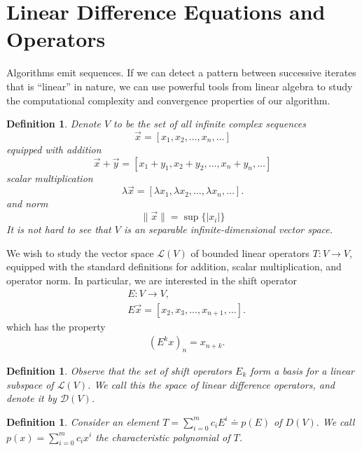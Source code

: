 \documentclass[12pt,reqno]{amsart}
\numberwithin{equation}{section}  %
\newtheorem{definition}[theorem]{Definition}
\begin{document}
\section{Linear Difference Equations and Operators}

Algorithms emit sequences. If we can detect a pattern between successive
iterates that is ``linear'' in nature, we can use powerful tools from linear
algebra to study the computational complexity and convergence properties of our
algorithm.
\begin{definition}
Denote $V$ to be the set of all infinite complex sequences
\begin{equation*}
\vec{x} = [x_1, x_2, \ldots, x_n, \ldots]
\end{equation*}
equipped with addition
\begin{equation*}
\vec{x} + \vec{y} = [x_1 + y_1, x_2 + y_2, \ldots, x_n + y_n, \ldots]	
\end{equation*}
scalar multiplication
\begin{equation*}
\lambda \vec{x} = [\lambda x_1, \lambda x_2, \ldots, \lambda x_n, \ldots].
\end{equation*}
and norm
\begin{equation*}
\| \vec{x} \| = \sup \{|x_i| \}
\end{equation*}
It is not hard to see that $V$ is an separable infinite-dimensional vector
space.
\end{definition}
We wish to study the vector space $\mathcal{L}(V)$ of bounded linear operators
$T:
V \to V$, equipped with the standard definitions for addition, scalar
multiplication, and operator norm.
In particular, we are interested in the shift operator
\begin{align*}
& E: V \to V,
\\
& E \vec{x} = [x_2, x_3, \ldots, x_{n+1}, \ldots].
\end{align*}
which has the property 
\begin{align*}
& (E^k x)_{n} = x_{n+k}.
\end{align*}
\begin{definition}
Observe that the set of shift operators ${E_k}$ form a basis for a
linear subspace of $\mathcal{L}(V)$. We call this the space of
\emph{linear difference operators}, and denote it by $\mathcal{D}(V)$.
\end{definition}
\begin{definition}
Consider an element $T = \sum_{i=0}^{m}c_i E^i \doteq p(E)$ of $D(V).$ We call
$p(x) = \sum_{i=0}^{m} c_i x^i$ the \emph{characteristic polynomial} of $T$.
\end{definition}
\end{document}
